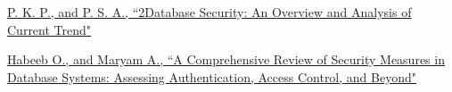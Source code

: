 \documentclass[12pt]{book} %
\begin{document}
\renewcommand\bibname{References} %
\begin{thebibliography}{1}

      \hyperref[sec:db_security_an_overview_and_analysis_of_current_trend_1]{P. K. P., and P. S. A., ``2Database Security: An Overview and Analysis of Current Trend"} 

      \hyperref[sec:a_comprve_rev_of_sec_measr_in_db_sys_assess_auth_accss_ctrl_bynd_1]{Habeeb O., and Maryam
A., ``A Comprehensive Review of Security Measures in Database Systems: Assessing Authentication, Access Control, and Beyond"} 

   

    
    
    
    
    
  
\end{thebibliography}
  
\end{document}
